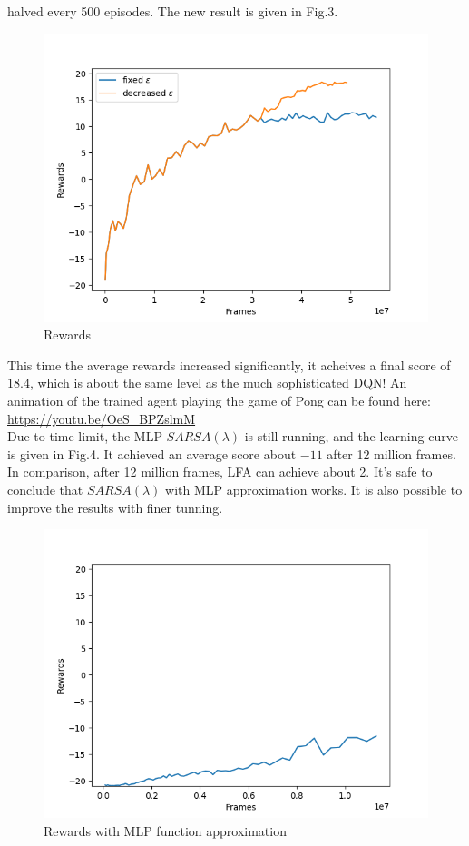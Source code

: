 \documentclass[12pt]{article}
\begin{document}
halved every 500 episodes. The new result is given in Fig.3.
\begin{figure}[h]
    \centering
    \includegraphics [scale=0.5]{rewards1.png}
    \caption {Rewards}
\end{figure}
This time the average rewards increased significantly, it acheives a
final score of $18.4$, which is about the same level as the much
sophisticated DQN! An animation of the trained agent playing the game
of Pong can be found here: \url{https://youtu.be/OeS_BPZslmM}\\

Due to time limit, the MLP $SARSA(\lambda)$ is still running, and the learning
curve is given in Fig.4. It achieved an average score about $-11$ after 12 
million frames. In comparison, after 12 million frames, LFA can achieve about 2.
It's safe to conclude that $SARSA(\lambda)$ with MLP approximation works. 
It is also possible to improve the results with finer tunning.
\begin{figure}[h]
    \centering
    \includegraphics [scale=0.5]{rewards_mlp.png}
    \caption {Rewards with MLP function approximation}
\end{figure}
\end{document}
